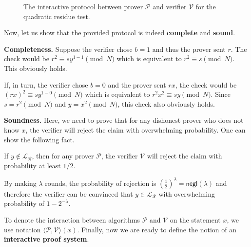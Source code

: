 \documentclass[../lecture-notes.tex]{subfiles}
\begin{document}
\begin{figure}

    \caption{The interactive protocol between prover $\mathcal{P}$ and verifier $\mathcal{V}$ for the quadratic residue test.}
\end{figure}

Now, let us show that the provided protocol is indeed \textbf{complete} and \textbf{sound}.

\textbf{Completeness.} Suppose the verifier chose $b=1$ and thus the prover sent $r$. The check would be $r^2 \equiv sy^{1-1} \pmod{N}$ which is equivalent to $r^2 \equiv s \pmod{N}$. This obviously holds. 

If, in turn, the verifier chose $b=0$ and the prover sent $rx$, the check would be $(rx)^2 \equiv sy^{1-0} \pmod{N}$ which is equivalent to $r^2x^2 \equiv sy \pmod{N}$. Since $s = r^2 \pmod{N}$ and $y = x^2 \pmod{N}$, this check also obviously holds.

\textbf{Soundness.} Here, we need to prove that for any dishonest prover who does not know $x$, the verifier will reject the claim with overwhelming probability. One can show the following fact.

\begin{proposition}
    If $y \not\in \mathcal{L}_{\mathcal{R}}$, then for any prover $\mathcal{P}$, the verifier $\mathcal{V}$ will reject the claim with probability at least $1/2$.
\end{proposition}

By making $\lambda$ rounds, the probability of rejection is $\left(\frac{1}{2}\right)^{\lambda} = \mathsf{negl}(\lambda)$ and therefore the verifier can be convinced that $y \in \mathcal{L}_{\mathcal{R}}$ with overwhelming probability of $1-2^{-\lambda}$.

To denote the interaction between algorithms $\mathcal{P}$ and $\mathcal{V}$ on the statement $x$, we use notation $\langle \mathcal{P}, \mathcal{V} \rangle(x)$. Finally, now we are ready to define the notion of an \textbf{interactive proof system}.
\end{document}
